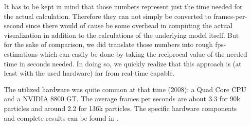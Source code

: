 It has to be kept in mind that those numbers represent just the time needed for the actual calculation. Therefore they can not simply be converted to frames-per-second since there would of cause be some overhead in computing the actual visualization in addition to the calculations of the underlying model itself. But for the sake of comparison, we did translate those numbers into rough fps-estimations which can easily be done by taking the reciprocal value of the needed time in seconds needed. In doing so, we quickly realize that this approach is (at least with the used hardware) far from real-time capable.

The utilized hardware was quite common at that time (2008): a Quad Core CPU and a NVIDIA 8800 GT. The average frames per seconds are about 3.3 for 90k particles and around 2.2 for 136k particles. The specific hardware components and complete results can be found in \cite{krivstof2009hydraulic}.



